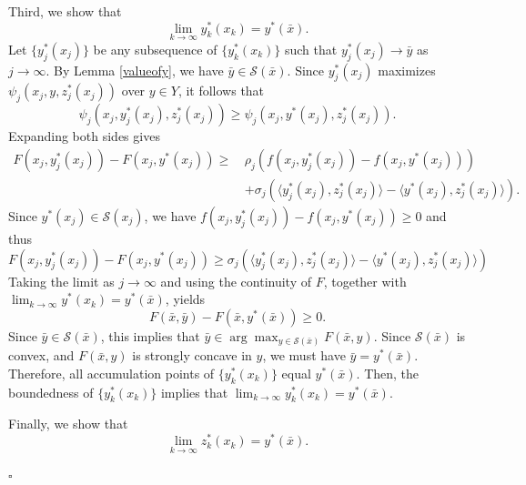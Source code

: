 \documentclass{article}
\newenvironment{proof}[1][Proof]{\par
	\normalfont\topsep6pt\relax
	\trivlist\item[\hskip\labelsep\itshape #1.]\ignorespaces
}{%
	\hfill\ensuremath{\square}\endtrivlist
}
\begin{document}
\begin{proof}[Proof for Theorem \ref{lim_yz}]
Third, we show that
\[
    \lim_{k \to\infty}y_k^*(x_k)=y^*(\bar{x}).
\]
Let $\{y_j^*(x_j)\}$ be any subsequence of $\{y_k^*(x_k)\}$ such that $y_j^*(x_j) \rightarrow \bar{y}$ as $j \rightarrow \infty$.
By Lemma \ref{valueofy}, we have $\bar{y} \in \mathcal{S}(\bar{x})$.
Since $y_j^*(x_j)$ maximizes $\psi_{j}(x_j, y, z_j^*(x_j))$ over $y \in Y$, it follows that
\[
\psi_{j}(x_j, y_j^*(x_j), z_j^*(x_j)) \ge \psi_{j}(x_j, y^*(x_j), z_j^*(x_j)). 
\]
Expanding both sides gives
\[
\begin{aligned}
    F(x_{j},y_{j}^*(x_{j}))-F(x_{j}, y^*(x_j)) \ge \, &\rho_{j}\left( f(x_{j}, y_{j}^*(x_{j}))-f(x_{j},y^*(x_j))\right) \\
    &+\sigma_{j}\left(\langle y_{j}^*(x_{j}), z_j^*(x_j)\rangle-\langle y^*(x_j), z_j^*(x_j)\rangle \right).
\end{aligned}
\]
Since $y^*(x_j) \in \mathcal{S}(x_j)$, we have $f(x_{j}, y_{j}^*(x_{j}))-f(x_{j},y^*(x_j)) \ge 0$ and thus
\[
 F(x_{j},y_{j}^*(x_{j}))-F(x_{j}, y^*(x_j)) \ge \sigma_{j}\left(\langle y_{j}^*(x_{j}), z_j^*(x_j)\rangle-\langle y^*(x_j), z_j^*(x_j)\rangle \right)
\]
Taking the limit as $j \rightarrow \infty$ and using the continuity of $F$, together with $ \lim_{k \to\infty}y^*(x_k)=y^*(\bar{x})$, yields
\[
F( \bar{x}, \bar{y} ) - F(\bar{x}, y^*(\bar{x})) \ge 0.
\]
Since $\bar{y} \in \mathcal{S}(\bar{x})$, this implies that $\bar{y} \in \arg\max_{y\in\mathcal{S}(\bar{x})}F(\bar{x},y) $. Since $\mathcal{S}(\bar{x})$ is convex, and $F(\bar{x},y)$ is strongly concave in $y$, we must have $\bar{y} = y^*(\bar{x})$.
Therefore, all accumulation points of $\{y_k^*(x_k)\}$ equal $y^*(\bar{x})$. Then, the boundedness of $\{y_k^*(x_k)\}$ implies that $\lim_{k \to\infty}y_k^*(x_k)=y^*(\bar{x})$.

Finally, we show that
\[
    \lim_{k \to\infty} z_k^*(x_k)=y^*(\bar{x}).
\]


\end{proof}
\end{document}
